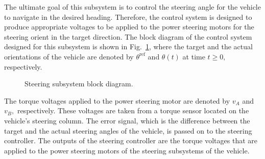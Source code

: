 \documentclass[conference]{IEEEtran}
\begin{document}
The ultimate goal of this subsystem is to control the steering angle for the vehicle to navigate in the desired heading. Therefore, the control system is designed to produce appropriate voltages to be applied to the power steering motors for the steering orient in the target direction. The block diagram of the control system designed for this subsystem is shown in Fig.~\ref{fig:steeringModelBlockDiagram}, where the target and the actual orientations of the vehicle are denoted by $\theta^{\text{ref}}$ and $\theta(t)$ at time $t\ge 0,$ respectively. %
%
\begin{figure}[htbp]
  \centering
  \caption{Steering subsystem block diagram.}
  \label{fig:steeringModelBlockDiagram}
\end{figure}
%
The torque voltages applied to the power steering motor are denoted by $v_{A}$ and $v_{B},$ respectively. These voltages are taken from a torque sensor located on the vehicle's steering column. The error signal, which is the difference between the target and the actual steering angles of the vehicle, is passed on to the steering controller. The outputs of the steering controller are the torque voltages that are applied to the power steering motors of the steering subsystems of the vehicle.
\end{document}

